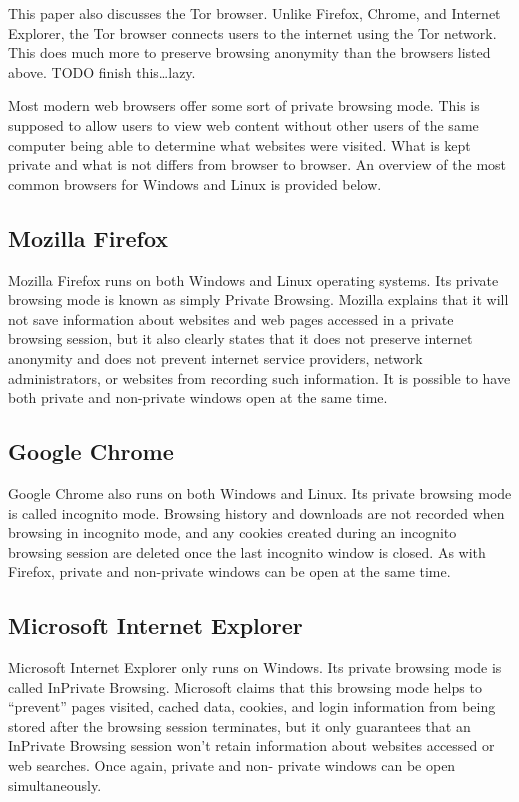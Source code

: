 \documentclass[pdftex,letterpaper,titlepage,11pt]{article}
\begin{document}
  This paper also discusses the Tor browser. Unlike Firefox, Chrome, and
  Internet Explorer, the Tor browser connects users to the internet using the
  Tor network. This does much more to preserve browsing anonymity than the
  browsers listed above. TODO finish this\ldots lazy. 

  Most modern web browsers offer some sort of private browsing mode. This is
  supposed to allow users to view web content without other users of the same
  computer being able to determine what websites were visited. What is kept
  private and what is not differs from browser to browser. An overview of the
  most common browsers for Windows and Linux is provided below.

    \subsection{Mozilla Firefox}
    Mozilla Firefox runs on both Windows and Linux operating systems. Its
    private browsing mode is known as simply Private Browsing. Mozilla explains
    that it will not save information about websites and web pages accessed in
    a private browsing session, but it also clearly states that it does not
    preserve internet anonymity and does not prevent internet service
    providers, network administrators, or websites from recording such
    information. It is possible to have both private and non-private windows
    open at the same time.\cite{verdi13}

    \subsection{Google Chrome}
    Google Chrome also runs on both Windows and Linux. Its private browsing
    mode is called incognito mode. Browsing history and downloads are not
    recorded when browsing in incognito mode, and any cookies created during
    an incognito browsing session are deleted once the last incognito window is
    closed. As with Firefox, private and non-private windows can be open at the
    same time.\cite{google13}

    \subsection{Microsoft Internet Explorer}
    Microsoft Internet Explorer only runs on Windows. Its private browsing mode
    is called InPrivate Browsing. Microsoft claims that this browsing mode
    helps to ``prevent'' pages visited, cached data, cookies, and login
    information from being stored after the browsing session terminates, but it
    only guarantees that an InPrivate Browsing session won't retain information
    about websites accessed or web searches. Once again, private and non-
    private windows can be open simultaneously.\cite{ie13}
\end{document}
